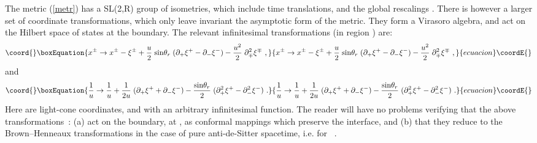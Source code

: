 \documentclass[a4paper,12pt,oneside]{article}
\begin{document}
 The metric (\ref{metr}) has a SL(2,R) group of  isometries, 
which include  time translations, and  the 
global rescalings \coordHE{}.  
There is however a larger set of coordinate transformations, which
only leave invariant the asymptotic form of the metric. 
They form a Virasoro algebra, and act on the 
Hilbert  space of states  at the boundary.  
The relevant infinitesimal transformations (in region \coordHE{}) are:
\begin{equation}\coord{}\boxEquation{
 x^\pm \rightarrow x^\pm - \xi^\pm +
 { u\over 2}\; {\rm sin}\theta_r\;
 ( \partial_+\xi^+ - \partial_-\xi^-)
- { u^2\over 2} \; \partial_{\mp}^2 \xi^{\mp}\ , 
\label{j1}
}{
 x^\pm \rightarrow x^\pm - \xi^\pm +
 { u\over 2}\; {\rm sin}\theta_r\;
 ( \partial_+\xi^+ - \partial_-\xi^-)
- { u^2\over 2} \; \partial_{\mp}^2 \xi^{\mp}\ , 
}{ecuacion}\coordE{}\end{equation}
and
\begin{equation}\coord{}\boxEquation{
 {1\over u}  \rightarrow {1\over u} + {1\over 2u}\;
(\partial_+\xi^+ + \partial_-\xi^-) - { {\rm sin}\theta_r\over 2}\;
(\partial_+^2\xi^+ -\partial_-^2\xi^-)\ .
\label{j2}
}{
 {1\over u}  \rightarrow {1\over u} + {1\over 2u}\;
(\partial_+\xi^+ + \partial_-\xi^-) - { {\rm sin}\theta_r\over 2}\;
(\partial_+^2\xi^+ -\partial_-^2\xi^-)\ .
}{ecuacion}\coordE{}\end{equation}
\vskip 0.15cm \noindent  Here \coordHE{}
are light-cone coordinates, and \coordHE{} 
with \coordHE{} an arbitrary  infinitesimal  function. 
The reader will have no problems  verifying that the above  transformations~:
(a)  act on the boundary, at \coordHE{},  as  conformal mappings
which  preserve  the \coordHE{} interface, 
and (b) that they reduce 
to the Brown--Henneaux transformations \cite{BH} 
in the case of  pure anti-de-Sitter spacetime,
 i.e. for \coordHE{}~. 
\end{document}
